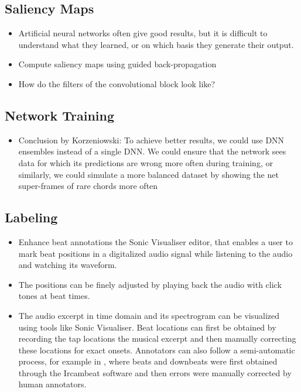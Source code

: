 \documentclass{scrartcl}
\begin{document}
\subsection{Saliency Maps}

\begin{itemize}
\item Artificial neural networks often give good results, but it is difficult to understand what they learned, or on which basis they generate their output.
\item Compute saliency maps using guided back-propagation \cite{Springenberg2014}
\item How do the filters of the convolutional block look like?
\end{itemize}



\subsection{Network Training}

\begin{itemize}
\item Conclusion by Korzeniowski: To achieve better results, we could use DNN ensembles instead of a single DNN. We could ensure that the network sees data for which its predictions are wrong more often during training, or similarly, we could simulate a more balanced dataset by showing the net super-frames of rare chords more often \cite{Korzeniowski2016}
\end{itemize}



\subsection{Labeling}

\begin{itemize}
\item Enhance beat annotations the Sonic Visualiser \cite{SonicVisualiser} editor, that enables a user to mark beat positions in a digitalized audio signal while listening to the audio and watching its waveform.
\item The positions can be finely adjusted by playing back the audio with click tones at beat times.
\item The audio excerpt in time domain and its spectrogram can be visualized using tools like Sonic Visualiser. Beat locations can first be obtained by recording the tap locations the musical excerpt and then manually correcting these locations for exact onsets.  Annotators can also follow a semi-automatic process, for example in \cite{Peeters2010}, where beats and downbeats were first obtained through the Ircambeat software and then errors were manually corrected by human annotators.
\end{itemize}
\end{document}
